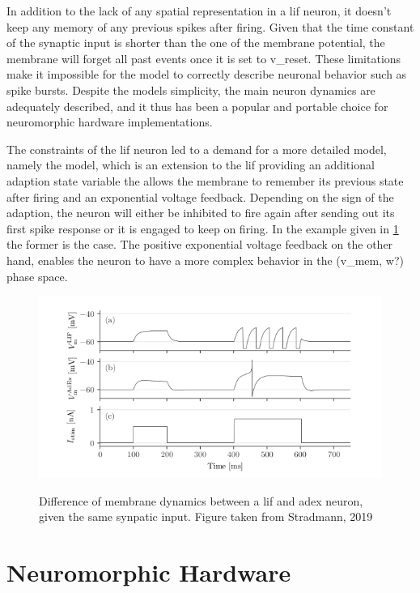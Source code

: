 In addition to the lack of any spatial representation in a \gls{lif} neuron, it doesn't keep any memory of any previous spikes after firing. Given that the time constant of the synaptic input is shorter than the one of the membrane potential, the membrane will forget all past events once it is set to \gls{v_reset}. These limitations make it impossible for the model to correctly describe neuronal behavior such as spike bursts. Despite the models simplicity, the main neuron dynamics are adequately described, and it thus has been a popular and portable choice for neuromorphic hardware implementations.

The constraints of the \gls{lif} neuron led to a demand for a more detailed model, namely the  model, which is an extension to the \gls{lif} providing an additional adaption state variable the allows the membrane to remember its previous state after firing and an exponential voltage feedback. Depending on the sign of the adaption, the neuron will either be inhibited to fire again after sending out its first spike response or it is engaged to keep on firing. In the example given in \cref{lifvsadex} the former is the case. The positive exponential voltage feedback on the other hand, enables the neuron to have a more complex behavior in the (\gls{v_mem}, w?) phase space.

\begin{figure}
	\includegraphics[width=\linewidth]{figures/LIFvsAdEx.png}
	\label{lifvsadex}
	\caption{Difference of membrane dynamics between a \gls{lif} and \gls{adex} neuron, given the same synpatic input. Figure taken from Stradmann, 2019}
\end{figure}

\section{Neuromorphic Hardware}

